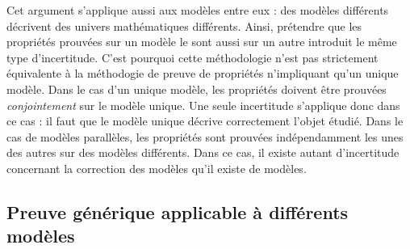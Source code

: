 		Cet argument s'applique aussi aux modèles entre eux : des modèles différents décrivent des univers mathématiques différents. Ainsi, prétendre que les propriétés prouvées sur un modèle le sont aussi sur un autre introduit le même type d'incertitude. C'est pourquoi cette méthodologie n'est pas strictement équivalente à la méthodogie de preuve de propriétés n'impliquant qu'un unique modèle. Dans le cas d'un unique modèle, les propriétés doivent être prouvées \emph{conjointement} sur le modèle unique. Une seule incertitude s'applique donc dans ce cas : il faut que le modèle unique décrive correctement l'objet étudié. Dans le cas de modèles parallèles, les propriétés sont prouvées indépendamment les unes des autres sur des modèles différents. Dans ce cas, il existe autant d'incertitude concernant la correction des modèles qu'il existe de modèles.

		\subsection{Preuve générique applicable à différents modèles}




